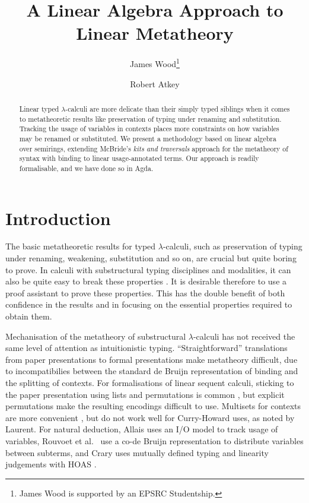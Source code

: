 \documentclass[submission,copyright,creativecommons]{eptcs}
\title{A Linear Algebra Approach to Linear Metatheory}
\author{
James Wood\thanks{James Wood is supported by an EPSRC Studentship.}
\institute{University of Strathclyde\\ Glasgow, United Kingdom}
\email{james.wood.100@strath.ac.uk}
\and
Robert Atkey
\institute{University of Strathclyde\\ Glasgow, United Kingdom}
\email{robert.atkey@strath.ac.uk}
}
\begin{document}
\maketitle

\begin{abstract}
  Linear typed $\lambda$-calculi are more delicate than their simply
  typed siblings when it comes to metatheoretic results like
  preservation of typing under renaming and substitution. Tracking the
  usage of variables in contexts places more constraints on how
  variables may be renamed or substituted. We present a methodology
  based on linear algebra over semirings, extending McBride's
  \emph{kits and traversals} approach for the metatheory of syntax with
  binding to linear usage-annotated terms. Our approach is readily
  formalisable, and we have done so in Agda.
\end{abstract}

\section{Introduction}

The basic metatheoretic results for typed $\lambda$-calculi, such as
preservation of typing under renaming, weakening, substitution and so
on, are crucial but quite boring to prove. In calculi with
substructural typing disciplines and modalities, it can also be quite
easy to break these properties \cite{wadler91use,BentonBPH93}. It is desirable
therefore to use a proof assistant to prove these properties. This has
the double benefit of both confidence in the results and in focusing
on the essential properties required to obtain them.

Mechanisation of the metatheory of substructural $\lambda$-calculi has
not received the same level of attention as intuitionistic
typing. ``Straightforward'' translations from paper presentations to
formal presentations make metatheory difficult, due to incompatibilies
between the standard de Bruijn representation of binding and the
splitting of contexts. For formalisations of linear sequent calculi,
sticking to the paper presentation using lists and permutations is
common \cite{power99,XavierORN18,laurent18}, but explicit permutations
make the resulting encodings difficult to use. Multisets for contexts
are more convenient \cite{ChaudhuriLR19}, but do not work well for
Curry-Howard uses, as noted by Laurent. For natural deduction, Allais
\cite{allais:LIPIcs:2018:10049} uses an I/O model to track usage of
variables, Rouvoet et al.\ \cite{RPKV20} use a co-de Bruijn
representation to distribute variables between subterms, and Crary
uses mutually defined typing and linearity judgements with HOAS
\cite{crary10}.
\end{document}

